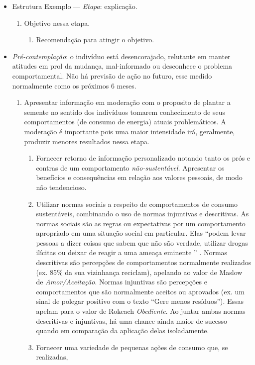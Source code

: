 \begin{itemize}
\item Estrutura Exemplo --- \emph{Etapa}: explicação.
\begin{enumerate}
\item Objetivo nessa etapa.
\begin{enumerate}
\item Recomendação para atingir o objetivo.
\end{enumerate}
\end{enumerate}
\item \emph{Pré-contemplação}: o indivíduo está desencorajado,
relutante em manter atitudes em prol da mudança, mal-informado ou
desconhece o problema comportamental. Não há previsão de ação no
futuro, esse medido normalmente como os próximos 6 meses.
\begin{enumerate}
\item Apresentar informação em moderação com o proposito de plantar a
semente no sentido dos indivíduos tomarem conhecimento de seus
comportamentos (de consumo de energia) atuais problemáticos. A
moderação é importante pois uma maior intensidade irá, geralmente,
produzir menores resultados nessa etapa.
\begin{enumerate}
\item Fornecer retorno de informação personalizado notando tanto os
prós e contras de um comportamento \emph{não-sustentável}. Apresentar
os benefícios e consequências em relação aos valores pessoais, de modo
não tendencioso.  
\item Utilizar normas sociais a respeito de comportamentos de consumo
sustentáveis, combinando o uso de normas injuntivas e descritivas. As
normas sociais são as regras ou expectativas por um comportamento
apropriado em uma situação social em particular. Elas ``podem levar
pessoas a dizer coisas que sabem que não são verdade, utilizar drogas
ilícitas ou deixar de reagir a uma ameaça eminente '' \cite[pp. 51,
tradução própria]{aceee_2010_estudos_feedback}.  Normas descritivas
são percepções de comportamentos normalmente realizados (ex. 85\% da
sua vizinhança reciclam), apelando ao valor de Maslow de
\emph{Amor/Aceitação}. Normas injuntivas são percepções e
comportamentos que são normalmente aceitos ou aprovados (ex. um sinal
de polegar positivo com o texto ``Gere menos resíduos''). Essas apelam
para o valor de Rokeach \emph{Obediente}.  Ao juntar ambas normas
descritivas e injuntivas, há uma chance ainda maior de sucesso quando
em comparação da aplicação delas isoladamente.
\item Fornecer uma variedade de pequenas ações de consumo que, se realizadas, 

\end{enumerate}
\end{enumerate}
\end{itemize}
